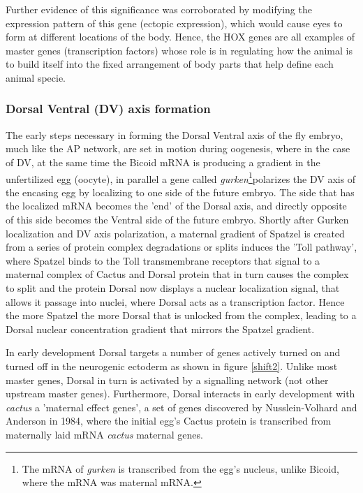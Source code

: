 Further evidence of this significance was corroborated by modifying the expression pattern of this gene (ectopic expression), which would cause eyes to form at different locations of the body\cite{pmid10461206}.  Hence, the HOX genes are all examples of master genes (transcription factors) whose role is in regulating how the animal is to build itself into the fixed arrangement of body parts that help define each animal specie. 

\subsubsection{Dorsal Ventral (DV) axis formation}
The early steps necessary in forming the Dorsal Ventral axis of the fly embryo, much like the AP network, are set in motion during oogenesis, where in the case of DV, at the same time the Bicoid mRNA is producing a gradient in the unfertilized egg (oocyte), in parallel a gene called \textit{gurken}\footnote{The mRNA of \textit{gurken} is transcribed from the egg's nucleus, unlike Bicoid, where the mRNA was maternal mRNA.}polarizes the DV axis of the encasing egg by localizing to one side of the future embryo.  The side that has the localized mRNA becomes the 'end' of the Dorsal axis, and directly opposite of this side becomes the Ventral side of the future embryo.  Shortly after Gurken localization and DV axis polarization, a maternal gradient of Spatzel is created from a series of protein complex degradations or splits induces the 'Toll pathway', where Spatzel binds to the Toll transmembrane receptors that signal to a maternal complex of Cactus and Dorsal protein that in turn causes the complex to split and the protein Dorsal now displays a nuclear localization signal, that allows it passage into nuclei, where Dorsal acts as a transcription factor.  Hence the more Spatzel the more Dorsal that is unlocked from the complex, leading to a Dorsal nuclear concentration gradient that mirrors the Spatzel gradient.

 In early development Dorsal targets a number of genes actively turned on and turned off in the neurogenic ectoderm as shown in figure \ref{shift2}.  Unlike most master genes, Dorsal in turn is activated by a signalling network (not other upstream master genes).  Furthermore, Dorsal interacts in early development with \textit{cactus} a 'maternal effect genes', a set of genes discovered by Nusslein-Volhard and Anderson in 1984, where the initial egg's Cactus protein is transcribed from maternally laid mRNA \textit{cactus} maternal genes.

